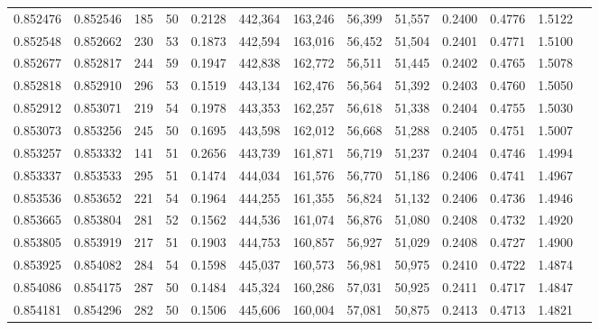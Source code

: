 \begin{tabular}{rrrrrrrrrrrrr}
0.852476 & 0.852546 &   185 &  50 &                                     0.2128 & 442,364 & 163,246 &  56,399 &  51,557 & 0.2400 & 0.4776 & 1.5122 \\
0.852548 & 0.852662 &   230 &  53 &                                     0.1873 & 442,594 & 163,016 &  56,452 &  51,504 & 0.2401 & 0.4771 & 1.5100 \\
0.852677 & 0.852817 &   244 &  59 &                                     0.1947 & 442,838 & 162,772 &  56,511 &  51,445 & 0.2402 & 0.4765 & 1.5078 \\
0.852818 & 0.852910 &   296 &  53 &                                     0.1519 & 443,134 & 162,476 &  56,564 &  51,392 & 0.2403 & 0.4760 & 1.5050 \\
0.852912 & 0.853071 &   219 &  54 &                                     0.1978 & 443,353 & 162,257 &  56,618 &  51,338 & 0.2404 & 0.4755 & 1.5030 \\
0.853073 & 0.853256 &   245 &  50 &                                     0.1695 & 443,598 & 162,012 &  56,668 &  51,288 & 0.2405 & 0.4751 & 1.5007 \\
0.853257 & 0.853332 &   141 &  51 &                                     0.2656 & 443,739 & 161,871 &  56,719 &  51,237 & 0.2404 & 0.4746 & 1.4994 \\
0.853337 & 0.853533 &   295 &  51 &                                     0.1474 & 444,034 & 161,576 &  56,770 &  51,186 & 0.2406 & 0.4741 & 1.4967 \\
0.853536 & 0.853652 &   221 &  54 &                                     0.1964 & 444,255 & 161,355 &  56,824 &  51,132 & 0.2406 & 0.4736 & 1.4946 \\
0.853665 & 0.853804 &   281 &  52 &                                     0.1562 & 444,536 & 161,074 &  56,876 &  51,080 & 0.2408 & 0.4732 & 1.4920 \\
0.853805 & 0.853919 &   217 &  51 &                                     0.1903 & 444,753 & 160,857 &  56,927 &  51,029 & 0.2408 & 0.4727 & 1.4900 \\
0.853925 & 0.854082 &   284 &  54 &                                     0.1598 & 445,037 & 160,573 &  56,981 &  50,975 & 0.2410 & 0.4722 & 1.4874 \\
0.854086 & 0.854175 &   287 &  50 &                                     0.1484 & 445,324 & 160,286 &  57,031 &  50,925 & 0.2411 & 0.4717 & 1.4847 \\
0.854181 & 0.854296 &   282 &  50 &                                     0.1506 & 445,606 & 160,004 &  57,081 &  50,875 & 0.2413 & 0.4713 & 1.4821 \\

\end{tabular}
